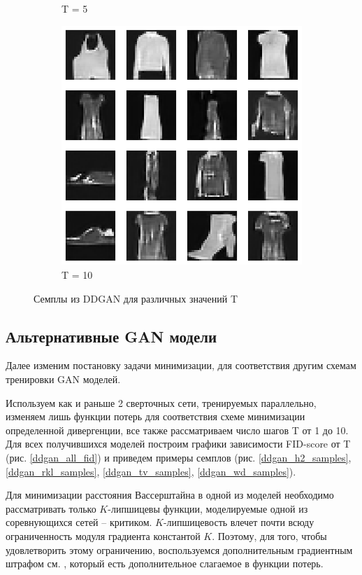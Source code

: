 \documentclass{article}
\begin{document}
\begin{figure}[H]
\begin{subfigure}[h]{0.3\linewidth}
		\caption{T = 5}
	\end{subfigure}
	\hfill
	\begin{subfigure}[h]{0.3\linewidth}
		\centering
		\includegraphics[scale=0.3]{../code/generated_DDGAN_10.png}
		\caption{T = 10}
	\end{subfigure}
	\caption{Семплы из DDGAN для различных значений T}\label{ddgan_samples}	
\end{figure}

\subsection{Альтернативные GAN модели}

Далее изменим постановку задачи минимизации, для соответствия другим схемам тренировки GAN моделей. 

Используем как и раньше 2 сверточных сети, тренируемых параллельно, изменяем лишь функции потерь для соответствия схеме минимизации определенной дивергенции, все также рассматриваем число шагов T от 1 до 10. Для всех получившихся моделей построим графики зависимости FID-score от T (рис. \ref{ddgan_all_fid}) и приведем примеры семплов (рис. \ref{ddgan_h2_samples}, \ref{ddgan_rkl_samples}, \ref{ddgan_tv_samples}, \ref{ddgan_wd_samples}).

Для минимизации расстояния Вассерштайна в одной из моделей необходимо рассматривать только $K$-липшицевы функции, моделируемые одной из соревнующихся сетей -- критиком. $K$-липшицевость влечет почти всюду ограниченность модуля градиента константой $K$. Поэтому, для того, чтобы удовлетворить этому ограничению, воспользуемся дополнительным градиентным штрафом см. \cite{DBLP:journals/corr/GulrajaniAADC17}, который есть дополнительное слагаемое в функции потерь. 
\end{document}
